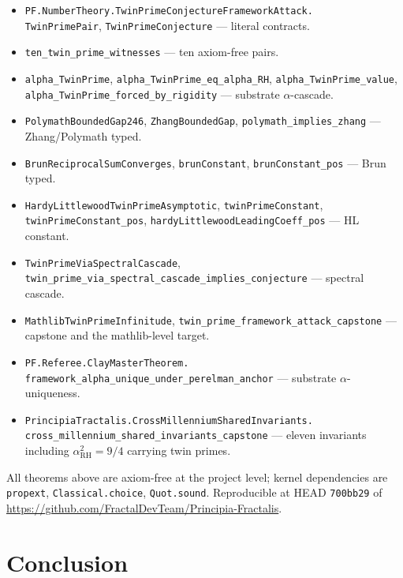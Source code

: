 \documentclass[11pt,a4paper]{article}
\theoremstyle{plain}
\theoremstyle{definition}
\begin{document}
\begin{itemize}[leftmargin=*,nosep]
\item \texttt{PF.NumberTheory.TwinPrimeConjectureFrameworkAttack.\\
  TwinPrimePair}, \texttt{TwinPrimeConjecture} --- literal contracts.
\item \texttt{ten\_twin\_prime\_witnesses} --- ten axiom-free pairs.
\item \texttt{alpha\_TwinPrime}, \texttt{alpha\_TwinPrime\_eq\_alpha\_RH},
  \texttt{alpha\_TwinPrime\_value},
  \texttt{alpha\_TwinPrime\_forced\_by\_rigidity}
  --- substrate $\alpha$-cascade.
\item \texttt{PolymathBoundedGap246},
  \texttt{ZhangBoundedGap},
  \texttt{polymath\_implies\_zhang} --- Zhang/Polymath typed.
\item \texttt{BrunReciprocalSumConverges},
  \texttt{brunConstant}, \texttt{brunConstant\_pos} --- Brun typed.
\item \texttt{HardyLittlewoodTwinPrimeAsymptotic},
  \texttt{twinPrimeConstant}, \texttt{twinPrimeConstant\_pos},
  \texttt{hardyLittlewoodLeadingCoeff\_pos} --- HL constant.
\item \texttt{TwinPrimeViaSpectralCascade},
  \texttt{twin\_prime\_via\_spectral\_cascade\_implies\_conjecture}
  --- spectral cascade.
\item \texttt{MathlibTwinPrimeInfinitude},
  \texttt{twin\_prime\_framework\_attack\_capstone}
  --- capstone and the mathlib-level target.
\item \texttt{PF.Referee.ClayMasterTheorem.\\
  framework\_alpha\_unique\_under\_perelman\_anchor}
  --- substrate $\alpha$-uniqueness.
\item \texttt{PrincipiaTractalis.CrossMillenniumSharedInvariants.\\
  cross\_millennium\_shared\_invariants\_capstone}
  --- eleven invariants including $\alpha_{\mathrm{RH}}^{2} = 9/4$
  carrying twin primes.
\end{itemize}

All theorems above are axiom-free at the project level; kernel
dependencies are \texttt{propext}, \texttt{Classical.choice},
\texttt{Quot.sound}. Reproducible at HEAD \texttt{700bb29} of
\url{https://github.com/FractalDevTeam/Principia-Fractalis}.

\section{Conclusion}
\label{sec:conclusion}
\end{document}
